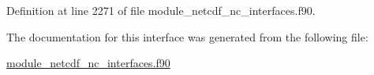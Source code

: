 Definition at line 2271 of file module\+\_\+netcdf\+\_\+nc\+\_\+interfaces.\+f90.



The documentation for this interface was generated from the following file\+:\begin{DoxyCompactItemize}
\item 
\hyperlink{module__netcdf__nc__interfaces_8f90}{module\+\_\+netcdf\+\_\+nc\+\_\+interfaces.\+f90}\end{DoxyCompactItemize}
